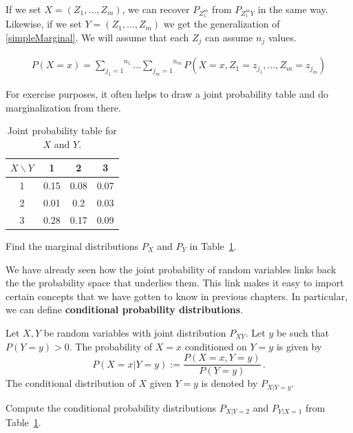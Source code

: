 If we set $ X = (Z_{1}, \ldots, Z_{m}) $, we can recover $ P_{Z_{1}^{m}} $ from $ P_{Z_{1}^{m}Y} $ in the same way. Likewise,
if we set $ Y = (Z_{1}, \ldots, Z_{m}) $ we get the generalization of \eqref{simpleMarginal}. We will assume that each $ Z_{j} $
can assume $ n_{j} $ values.

\begin{align}
P(X=x) = \overset{n_{1}}{\underset{j_{1}=1}{\sum}}\ldots \overset{n_{m}}{\underset{j_{m}=1}{\sum}} 
P(X=x,Z_{1}=z_{j_{1}}, \ldots, Z_{m}=z_{j_{m}})
\end{align}

For exercise purposes, it often helps to draw a joint probability table and do marginalization from there.

\begin{table}
\center
\begin{tabular}{|c|c|c|c|}
\hline
$X\backslash Y$	& 1		& 2		& 3		\\
\hline
1				& 0.15	& 0.08	& 0.07	\\
2				& 0.01	& 0.2	& 0.03	\\	
3				& 0.28	& 0.17	& 0.09	\\
\hline
\end{tabular}
\caption{Joint probability table for $ X $ and $ Y $.}
\label{jointTable}
\end{table}

\begin{Exercise}
Find the marginal distributions $ P_X $ and $ P_{Y} $ in Table~\ref{jointTable}.
\end{Exercise}

We have already seen how the joint probability of random variables links back the the probability space that underlies them.
This link makes it easy to import certain concepts that we have
gotten to know in previous chapters. In particular, we can define \textbf{conditional probability distributions}.

\begin{Definition}
Let $X,Y$ be random variables with joint distribution $P_{XY}$. Let
$y$ be such that $P(Y=y)>0$. The probability of $ X = x $ conditioned on $ Y=y $ is given by
$$ P(X=x|Y=y) := \dfrac{P(X=x, Y=y)}{P(Y=y)} \, . $$
The conditional distribution of $X$ given $Y=y$ is denoted by $P_{X|Y=y}$.
\end{Definition} 

\begin{Exercise}
Compute the conditional probability distributions $ P_{X|Y=2} $ and $ P_{Y|X=1} $ from Table~\ref{jointTable}.
\end{Exercise}

